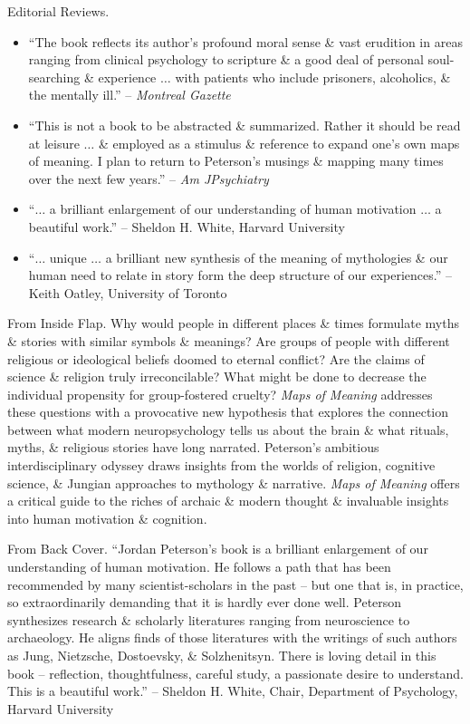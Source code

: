 \documentclass{article}
\begin{document}
\begin{enumerate}
	{\sf Editorial Reviews.}
	\begin{itemize}
		\item ``The book reflects its author's profound moral sense \& vast erudition in areas ranging from clinical psychology to scripture \& a good deal of personal soul-searching \& experience $\ldots$ with patients who include prisoners, alcoholics, \& the mentally ill.'' -- {\it Montreal Gazette}
		\item ``This is not a book to be abstracted \& summarized. Rather it should be read at leisure $\ldots$ \& employed as a stimulus \& reference to expand one's own maps of meaning. I plan to return to {\sc Peterson}'s musings \& mapping many times over the next few years.'' -- {\it Am JPsychiatry}
		\item ``$\ldots$ a brilliant enlargement of our understanding of human motivation $\ldots$ a beautiful work.'' -- {\sc Sheldon H. White}, Harvard University
		\item ``$\ldots$ unique $\ldots$ a brilliant new synthesis of the meaning of mythologies \& our human need to relate in story form the deep structure of our experiences.'' -- {\sc Keith Oatley}, University of Toronto
	\end{itemize}
	{\sf From Inside Flap.} Why would people in different places \& times formulate myths \& stories with similar symbols \& meanings? Are groups of people with different religious or ideological beliefs doomed to eternal conflict? Are the claims of science \& religion truly irreconcilable? What might be done to decrease the individual propensity for group-fostered cruelty? {\it Maps of Meaning} addresses these questions with a provocative new hypothesis that explores the connection between what modern neuropsychology tells us about the brain \& what rituals, myths, \& religious stories have long narrated. {\sc Peterson}'s ambitious interdisciplinary odyssey draws insights from the worlds of religion, cognitive science, \& Jungian approaches to mythology \& narrative. {\it Maps of Meaning} offers a critical guide to the riches of archaic \& modern thought \& invaluable insights into human motivation \& cognition.

	{\sf From Back Cover.} ``{\sc Jordan Peterson}'s book is a brilliant enlargement of our understanding of human motivation. He follows a path that has been recommended by many scientist-scholars in the past -- but one that is, in practice, so extraordinarily demanding that it is hardly ever done well. {\sc Peterson} synthesizes research \& scholarly literatures ranging from neuroscience to archaeology. He aligns finds of those literatures with the writings of such authors as {\sc Jung, Nietzsche, Dostoevsky, \& Solzhenitsyn}. There is loving detail in this book -- reflection, thoughtfulness, careful study, a passionate desire to understand. This is a beautiful work.'' -- {\sc Sheldon H. White}, Chair, Department of Psychology, Harvard University


\end{enumerate}
\end{document}
